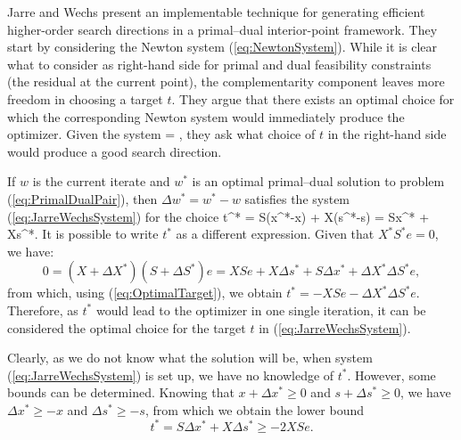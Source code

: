 Jarre and Wechs \cite{JarreWechs} %
present an implementable technique for generating efficient 
higher-order search directions in a primal--dual interior-point framework.
They start by considering the Newton system (\ref{eq:NewtonSystem}).
While it is clear what to consider as right-hand 
side for primal and dual feasibility constraints (the residual 
at the current point), the complementarity component leaves more 
freedom in choosing a target $t$. They argue that there exists 
an optimal choice for which the corresponding Newton system would 
immediately produce the optimizer.
Given the system
\be
\label{eq:JarreWechsSystem}
 =
\left[ \begin{array}{c}
    b-Ax \\ c-A^Ty-s \\ t
  \end{array} \right],
\ee
they ask what choice of $t$ in the right-hand side 
would produce a good search direction.

If $w$ is the current iterate and 
$w^*$ is an optimal primal--dual solution to 
problem (\ref{eq:PrimalDualPair}), then 
$\Delta w^*= w^*-w$ satisfies the 
system (\ref{eq:JarreWechsSystem}) for the choice
\be  \label{eq:OptimalTarget}
  t^* = S(x^*-x) + X(s^*-s) = S\Delta x^* + X\Delta s^*.
\ee
It is possible to write $t^*$ as a different expression. 
Given that $X^*S^*e=0$, we have:
\[
  0 = (X+\Delta X^*)(S+\Delta S^*)e 
    = XSe + X\Delta s^* +S\Delta x^* +\Delta X^*\Delta S^*e,
\]
from which, using (\ref{eq:OptimalTarget}), we obtain
$t^* = -XSe - \Delta X^* \Delta S^*e$.
Therefore, as $t^*$ would lead to the optimizer in one single iteration,
it can be considered the optimal choice for the target $t$
in (\ref{eq:JarreWechsSystem}).

Clearly, as we do not know what the solution will be,
when system (\ref{eq:JarreWechsSystem}) is set up, 
we have no knowledge of $t^*$. 
However, some bounds can be determined. Knowing that 
$x+\Delta x^* \ge 0$ and $s+\Delta s^* \ge 0$, we have 
$\Delta x^* \ge -x$ and $\Delta s^* \ge -s$, from which we obtain
the lower bound
\[
  t^*= S\Delta x^* + X\Delta s^* \ge -2XSe.
\]


